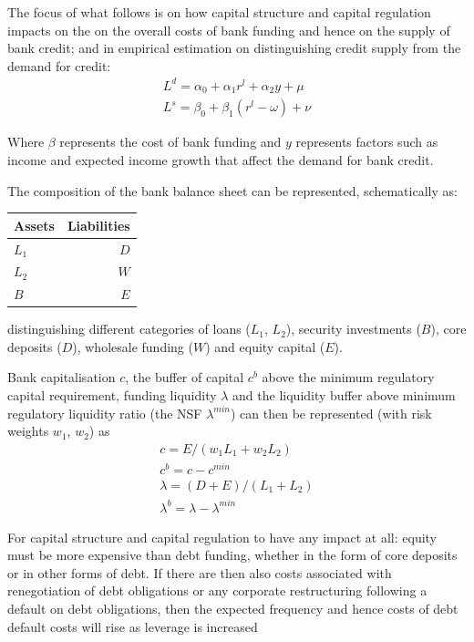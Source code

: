 \documentclass[
  12,
]{article}
\begin{document}
The focus of what follows is on how capital structure and capital regulation impacts on the on the overall costs of bank funding and hence on the supply of bank credit; and in empirical estimation on distinguishing credit supply from the demand for credit:
\[
\begin{split}
L^d =\alpha_0+\alpha_1 r^l+\alpha_2 y + \mu\\
L^s =\beta_0+\beta_1 (r^l-\omega)+\nu 
\end{split}
\]

Where \(\beta\) represents the cost of bank funding and \(y\) represents factors such as income and expected income growth that affect the demand for bank credit.

The composition of the bank balance sheet can be represented, schematically as:

\begin{center}
\begin{tabular}{ l | r}
Assets  & Liabilities \\
\hline
$L_1$   & $D$ \\
$L_2$   & $W$ \\
$B$ & $E$ \\
\hline
\end{tabular}
\end{center}

distinguishing different categories of loans (\(L_1\), \(L_2\)), security investments (\(B\)), core deposits (\(D\)), wholesale funding (\(W\)) and equity capital (\(E\)).

Bank capitalisation \(c\), the buffer of capital \(c^b\) above the minimum regulatory capital requirement, funding liquidity \(\lambda\) and the liquidity buffer above minimum regulatory liquidity ratio (the NSF \(\lambda^{min}\)) can then be represented (with risk weights \(w_1\), \(w_2\)) as
\[
\begin{split}
c=E/(w_1 L_1+ w_2 L_2)\\
c^b =c-c^{min}\\
\lambda =(D+E)/(L_1+L_2)\\
\lambda^{b}=\lambda-\lambda^{min}
\end{split}
\]

For capital structure and capital regulation to have any impact at all: equity must be more expensive than debt funding, whether in the form of core deposits or in other forms of debt. If there are then also costs associated with renegotiation of debt obligations or any corporate restructuring following a default on debt obligations, then the expected frequency and hence costs of debt default costs will rise as leverage is increased
\end{document}
